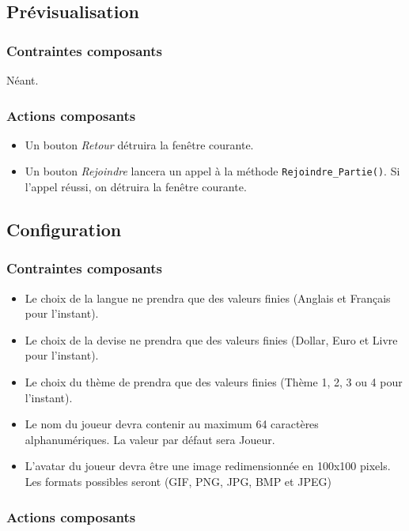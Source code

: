\subsection{Prévisualisation}

\subsubsection{Contraintes composants}
Néant.

\subsubsection{Actions composants}

\begin{itemize}
	\item Un bouton \textit{Retour} détruira la fenêtre courante.
	\item Un bouton \textit{Rejoindre} lancera un appel à la méthode 
	      \texttt{Rejoindre\_Partie()}. Si l'appel réussi, on détruira la fenêtre courante.
\end{itemize}

\subsection{Configuration}

\subsubsection{Contraintes composants}

\begin{itemize}
	\item Le choix de la langue ne prendra que des valeurs finies (Anglais et 
	Français pour l'instant).
	\item Le choix de la devise ne prendra que des valeurs finies (Dollar, Euro
	      et Livre pour l'instant).
	\item Le choix du thème de prendra que des valeurs finies (Thème 1, 2, 3 ou 
	      4 pour l'instant).
	\item Le nom du joueur devra contenir au maximum 64 caractères 
	      alphanumériques. La valeur par défaut sera Joueur.
	\item L'avatar du joueur devra être une image redimensionnée en 100x100 pixels.
	      Les formats possibles seront (GIF, PNG, JPG, BMP et JPEG)
\end{itemize}

\subsubsection{Actions composants}

